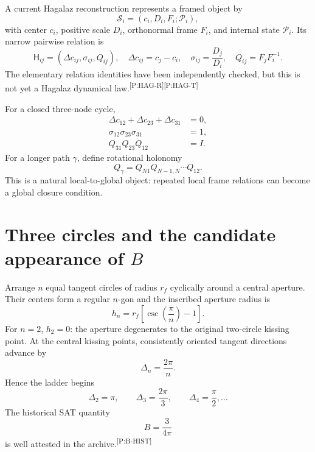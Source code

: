 \documentclass[11pt]{article}
\newcommand{\mcite}[1]{\textsuperscript{\tiny\textsf{[#1]}}}
\newcommand{\Hrel}{\mathsf{H}}
\begin{document}
A current Hagalaz reconstruction represents a framed object by
\begin{equation}
\mathcal S_i=(c_i,D_i,F_i;\mathcal P_i),
\end{equation}
with center $c_i$, positive scale $D_i$, orthonormal frame $F_i$, and internal state $\mathcal P_i$. Its narrow pairwise relation is
\begin{equation}
\Hrel_{ij}=(\Delta c_{ij},\sigma_{ij},Q_{ij}),\quad
\Delta c_{ij}=c_j-c_i,\quad
\sigma_{ij}=\frac{D_j}{D_i},\quad
Q_{ij}=F_jF_i^{-1}.
\end{equation}
The elementary relation identities have been independently checked, but this is not yet a Hagalaz dynamical law.\mcite{P:HAG-R}\mcite{P:HAG-T}

For a closed three-node cycle,
\begin{align}
\Delta c_{12}+\Delta c_{23}+\Delta c_{31}&=0,\\
\sigma_{12}\sigma_{23}\sigma_{31}&=1,\\
Q_{31}Q_{23}Q_{12}&=I.
\end{align}
For a longer path $\gamma$, define rotational holonomy
\begin{equation}
Q_\gamma=Q_{N1}Q_{N-1,N}\cdots Q_{12}.
\end{equation}
This is a natural local-to-global object: repeated local frame relations can become a global closure condition.

\section{Three circles and the candidate appearance of $B$}

Arrange $n$ equal tangent circles of radius $r_f$ cyclically around a central aperture. Their centers form a regular $n$-gon and the inscribed aperture radius is
\begin{equation}
h_n=r_f\left[\csc\left(\frac{\pi}{n}\right)-1\right].
\end{equation}
For $n=2$, $h_2=0$: the aperture degenerates to the original two-circle kissing point. At the central kissing points, consistently oriented tangent directions advance by
\begin{equation}
\Delta_n=\frac{2\pi}{n}.
\end{equation}
Hence the ladder begins
\begin{equation}
\Delta_2=\pi,\qquad \Delta_3=\frac{2\pi}{3},\qquad \Delta_4=\frac{\pi}{2},\ldots
\end{equation}
The historical SAT quantity
\begin{equation}
B=\frac{3}{4\pi}
\end{equation}
is well attested in the archive.\mcite{P:B-HIST}
\end{document}
